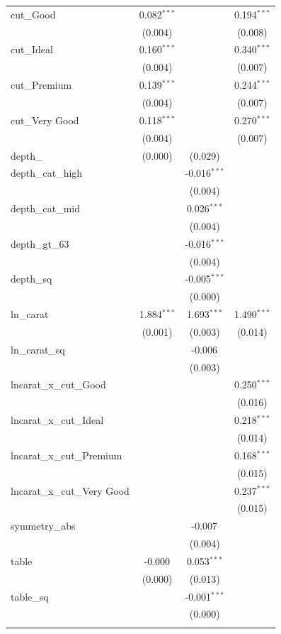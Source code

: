 \begin{table}[!htbp]
\begin{tabular}{@{\extracolsep{5pt}}lccc}
 cut_Good & 0.082$^{***}$ & & 0.194$^{***}$ \\
& (0.004) & & (0.008) \\
 cut_Ideal & 0.160$^{***}$ & & 0.340$^{***}$ \\
& (0.004) & & (0.007) \\
 cut_Premium & 0.139$^{***}$ & & 0.244$^{***}$ \\
& (0.004) & & (0.007) \\
 cut_Very Good & 0.118$^{***}$ & & 0.270$^{***}$ \\
& (0.004) & & (0.007) \\
 depth_%
& (0.000) & (0.029) & \\
 depth_cat_high & & -0.016$^{***}$ & \\
& & (0.004) & \\
 depth_cat_mid & & 0.026$^{***}$ & \\
& & (0.004) & \\
 depth_gt_63 & & -0.016$^{***}$ & \\
& & (0.004) & \\
 depth_sq & & -0.005$^{***}$ & \\
& & (0.000) & \\
 ln_carat & 1.884$^{***}$ & 1.693$^{***}$ & 1.490$^{***}$ \\
& (0.001) & (0.003) & (0.014) \\
 ln_carat_sq & & -0.006$^{}$ & \\
& & (0.003) & \\
 lncarat_x_cut_Good & & & 0.250$^{***}$ \\
& & & (0.016) \\
 lncarat_x_cut_Ideal & & & 0.218$^{***}$ \\
& & & (0.014) \\
 lncarat_x_cut_Premium & & & 0.168$^{***}$ \\
& & & (0.015) \\
 lncarat_x_cut_Very Good & & & 0.237$^{***}$ \\
& & & (0.015) \\
 symmetry_abs & & -0.007$^{}$ & \\
& & (0.004) & \\
 table & -0.000$^{}$ & 0.053$^{***}$ & \\
& (0.000) & (0.013) & \\
 table_sq & & -0.001$^{***}$ & \\
& & (0.000) & \\
\hline \\[-1.8ex]

\end{tabular}
\end{table}
